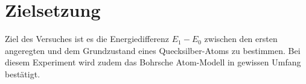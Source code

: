 \section{Zielsetzung}
\label{sec:zielsetzung}
Ziel des Versuches ist es die Energiedifferenz $E_1 -E_0$ zwischen den ersten angeregten und dem Grundzustand eines 
Quecksilber-Atoms zu bestimmen. Bei diesem Experiment wird zudem das Bohrsche Atom-Modell in gewissen Umfang bestätigt.